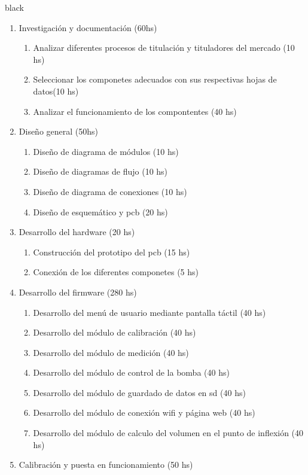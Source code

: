 \documentclass[11pt]{charter}
\begin{document}
\begin{consigna}{black}

\begin{enumerate}
\item Investigación y documentación (60hs)
	\begin{enumerate}
	\item Analizar diferentes procesos de titulación y tituladores del mercado (10 hs)
	\item Seleccionar los componetes adecuados con sus respectivas hojas de datos(10 hs)
	\item Analizar el funcionamiento de los compontentes (40 hs)
	\end{enumerate}
\item Diseño general (50hs)
	\begin{enumerate}
	\item Diseño de diagrama de módulos (10 hs)
	\item Diseño de diagramas de flujo (10 hs)
	\item Diseño de diagrama de conexiones (10 hs)
	\item Diseño de esquemático y pcb (20 hs)
	\end{enumerate}
\item Desarrollo del hardware (20 hs)
	\begin{enumerate}
	\item Construcción del prototipo del pcb (15 hs)
	\item Conexión de los diferentes componetes (5 hs)
	\end{enumerate}
\item Desarrollo del firmware (280 hs)	
	\begin{enumerate}
	\item Desarrollo del menú de usuario mediante pantalla táctil (40 hs)
	\item Desarrollo del módulo de calibración (40 hs)
	\item Desarrollo del módulo de medición (40 hs)
	\item Desarrollo del módulo de control de la bomba (40 hs)
	\item Desarrollo del módulo de guardado de datos en sd (40 hs)
	\item Desarrollo del módulo de conexión wifi y página web (40 hs)
	\item Desarrollo del módulo de calculo del volumen en el punto de inflexión (40 hs)
	\end{enumerate}
\item Calibración y puesta en funcionamiento (50 hs)

\end{enumerate}
\end{consigna}
\end{document}
